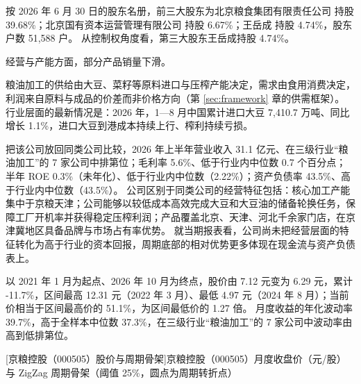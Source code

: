  按 2026 年 6 月 30 日的股东名册，前三大股东为北京粮食集团有限责任公司 持股 39.68\%；北京国有资本运营管理有限公司 持股 6.67\%；王岳成 持股 4.74\%，股东户数 51,588 户。 从控制权角度看，第三大股东王岳成持股 4.74\%。

 经营与产能方面，部分产品销量下滑。

 粮油加工的供给由大豆、菜籽等原料进口与压榨产能决定，需求由食用消费决定，利润来自原料与成品的价差而非价格方向（第 \ref{sec:framework} 章的供需框架）。 行业层面的最新情况是：2026 年，1—8 月中国累计进口大豆 7,410.7 万吨、同比增长 1.1\%，进口大豆到港成本持续上行、榨利持续亏损。

 把该公司放回同类公司比较，2026 年上半年营业收入 31.1 亿元、在三级行业“粮油加工”的 7 家公司中排第位；毛利率 5.6\%、低于行业内中位数 0.7 个百分点；半年 ROE 0.3\%（未年化）、低于行业内中位数（2.22\%）；资产负债率 43.5\%、高于行业内中位数（43.5\%）。 公司区别于同类公司的经营特征包括：核心加工产能集中于京粮天津；公司能够以较低成本高效完成大豆和大豆油的储备轮换任务，保障工厂开机率并获得稳定压榨利润；产品覆盖北京、天津、河北千余家门店，在京津冀地区具备品牌与市场占有率优势。 就当期报表看，公司尚未把经营层面的特征转化为高于行业的资本回报，周期底部的相对优势更多体现在现金流与资产负债表上。

 以 2021 年 1 月为起点、2026 年 10 月为终点，股价由 7.12 元变为 6.29 元，累计 -11.7\%，区间最高 12.31 元（2022 年 3 月）、最低 4.97 元（2024 年 8 月）；当前价相当于区间最高价的 51.1\%，为区间最低价的 1.27 倍。 月度收益的年化波动率 39.7\%，高于全样本中位数 37.3\%，在三级行业“粮油加工”的 7 家公司中波动率由高到低排第位。

\begin{center}
\begin{minipage}{\textwidth}\centering
{}

[京粮控股（000505）股价与周期骨架]{京粮控股（000505）月度收盘价（元/股）与 ZigZag 周期骨架（阈值 25\%，圆点为周期转折点）}
\end{minipage}
\end{center}

